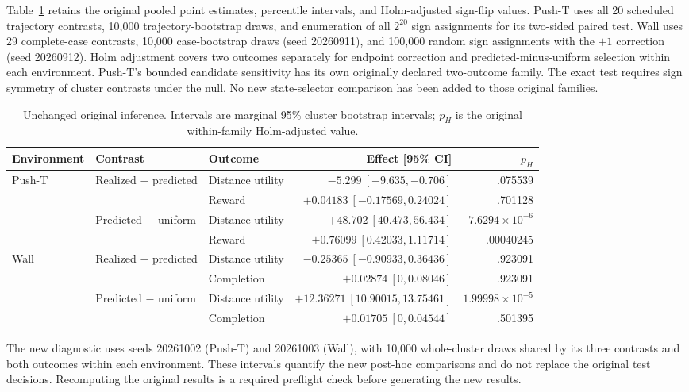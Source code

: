 \documentclass{article}
\begin{document}
Table~\ref{tab:original} retains the original pooled point estimates, percentile
intervals, and Holm-adjusted sign-flip values. Push-T uses all 20 scheduled
trajectory contrasts, 10,000 trajectory-bootstrap draws, and enumeration of
all $2^{20}$ sign assignments for its two-sided paired test. Wall uses 29
complete-case contrasts, 10,000 case-bootstrap draws (seed 20260911), and
100,000 random sign assignments with the $+1$ correction (seed 20260912).
Holm adjustment covers two outcomes separately for endpoint correction and
predicted-minus-uniform selection within each environment. Push-T's bounded
candidate sensitivity has its own originally declared two-outcome family.
The exact test requires sign symmetry of cluster contrasts under the null.
No new state-selector comparison has been added to those original families.

\begin{table}[h]
\caption{Unchanged original inference. Intervals are marginal 95\% cluster
bootstrap intervals; $p_H$ is the original within-family Holm-adjusted value.}
\label{tab:original}
\centering\small
\begingroup
\setlength{\tabcolsep}{3pt}
\begin{tabular}{lllrr}
\toprule
Environment & Contrast & Outcome & Effect [95\% CI] & $p_H$\\
\midrule
Push-T & Realized $-$ predicted & Distance utility & $-5.299\ [-9.635,-0.706]$ & .075539\\
 & & Reward & $+0.04183\ [-0.17569,0.24024]$ & .701128\\
 & Predicted $-$ uniform & Distance utility & $+48.702\ [40.473,56.434]$ & $7.6294\!\times\!10^{-6}$\\
 & & Reward & $+0.76099\ [0.42033,1.11714]$ & .00040245\\
Wall & Realized $-$ predicted & Distance utility & $-0.25365\ [-0.90933,0.36436]$ & .923091\\
 & & Completion & $+0.02874\ [0,0.08046]$ & .923091\\
 & Predicted $-$ uniform & Distance utility & $+12.36271\ [10.90015,13.75461]$ & $1.99998\!\times\!10^{-5}$\\
 & & Completion & $+0.01705\ [0,0.04544]$ & .501395\\
\bottomrule
\end{tabular}
\endgroup
\end{table}

The new diagnostic uses seeds 20261002 (Push-T) and 20261003 (Wall), with
10,000 whole-cluster draws shared by its three contrasts and both outcomes
within each environment. These intervals quantify the new post-hoc comparisons
and do not replace the original test decisions. Recomputing the original
results is a required preflight check before generating the new results.
\end{document}
